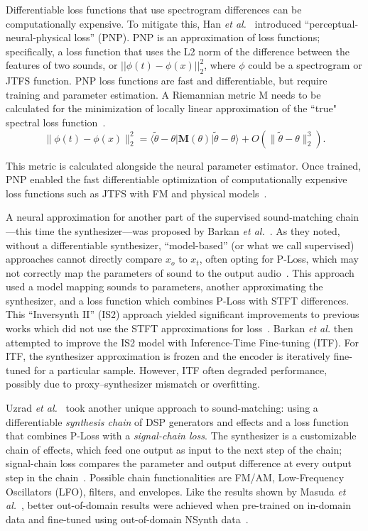 Differentiable loss functions that use spectrogram differences can be computationally expensive. To mitigate this, Han \textit{et al.}~\cite{han2023perceptual} introduced ``perceptual-neural-physical loss'' (PNP). PNP is an approximation of loss functions; specifically, a loss function that uses the L2 norm of the difference between the features of two sounds, or $||\phi(t) - \phi(x)||^2_2$, where $\phi$ could be a spectrogram or JTFS function. PNP loss functions are fast and differentiable, but require training and parameter estimation. A Riemannian metric M needs to be calculated for the minimization of locally linear approximation of the ``true" spectral loss function~\cite{han2023perceptual}. 
\[
\|\phi(t) - \phi(x)\|_2^2 = \langle \tilde{\theta} - \theta | \mathbf{M}(\theta) | \tilde{\theta} - \theta \rangle + O(\|\tilde{\theta} - \theta\|_2^3). \tag{4}
\]

This metric is calculated alongside the neural parameter estimator. Once trained, PNP enabled the fast differentiable optimization of computationally expensive loss functions such as JTFS with FM and physical models~\cite{han2023perceptual,han2024learning}.

A neural approximation for another part of the supervised sound-matching chain---this time the synthesizer---was proposed by Barkan \textit{et al.}~\cite{barkan2023inversynthII}. As they noted, without a differentiable synthesizer, ``model-based'' (or what we call supervised) approaches cannot directly compare $x_o$ to $x_t$, often opting for P-Loss, which may not correctly map the parameters of sound to the output audio~\cite{esling2019flow,han2023perceptual,masuda2023improving}. This approach used a model mapping sounds to parameters, another approximating the synthesizer, and a loss function which combines P-Loss with STFT differences. This ``Inversynth II'' (IS2) approach yielded significant improvements to previous works which did not use the STFT approximations for loss~\cite{esling2019flow,barkan2019inversynth}. Barkan \textit{et al.} then attempted to improve the IS2 model with Inference-Time
Fine-tuning (ITF). For ITF, the synthesizer approximation is frozen and the encoder is iteratively fine-tuned for a particular sample. However, ITF often degraded performance, possibly due to proxy–synthesizer mismatch or overfitting.

Uzrad \textit{et al.}~\cite{uzrad2024diffmoog} took another unique approach to sound-matching: using a differentiable \textit{synthesis chain} of DSP generators and effects and a loss function that combines P-Loss with a \textit{signal-chain loss}. The synthesizer is a customizable chain of effects, which feed one output as input to the next step of the chain; signal-chain loss compares the parameter and output difference at every output step in the chain~\cite{uzrad2024diffmoog}. Possible chain functionalities are FM/AM, Low-Frequency Oscillators (\gls{LFO}), filters, and envelopes. Like the results shown by Masuda \textit{et al.}~\cite{masuda2021soundmatch}, better out-of-domain results were achieved when pre-trained on in-domain data and fine-tuned using out-of-domain NSynth data~\cite{engel2017neural}.


